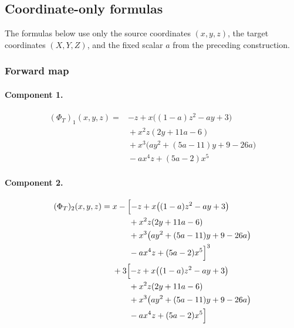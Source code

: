 \subsection{Coordinate-only formulas}
The formulas below use only the source coordinates $(x,y,z)$, the target
coordinates $(X,Y,Z)$, and the fixed scalar $a$ from the preceding construction.

\subsubsection*{Forward map}
\paragraph{Component 1.}
\begingroup
\allowdisplaybreaks[4]
\begin{align*}
(\Phi_T)_1(x,y,z)={}&-z+x\bigl((1-a)z^2-ay+3\bigr)\\
&{}+x^2z(2y+11a-6)\\
&{}+x^3\bigl(ay^2+(5a-11)y+9-26a\bigr)\\
&{}-ax^4z+(5a-2)x^5
\end{align*}
\endgroup

\paragraph{Component 2.}
\begingroup
\allowdisplaybreaks[4]
\begin{align*}
(\Phi_T)_2(x,y,z)={}&x-\Bigl[-z+x\bigl((1-a)z^2-ay+3\bigr)\\
&\qquad +x^2z(2y+11a-6)\\
&\qquad +x^3\bigl(ay^2+(5a-11)y+9-26a\bigr)\\
&\qquad -ax^4z+(5a-2)x^5\Bigr]^3\\
&{}+3\Bigl[-z+x\bigl((1-a)z^2-ay+3\bigr)\\
&\qquad +x^2z(2y+11a-6)\\
&\qquad +x^3\bigl(ay^2+(5a-11)y+9-26a\bigr)\\
&\qquad -ax^4z+(5a-2)x^5\Bigr]
\end{align*}
\endgroup

